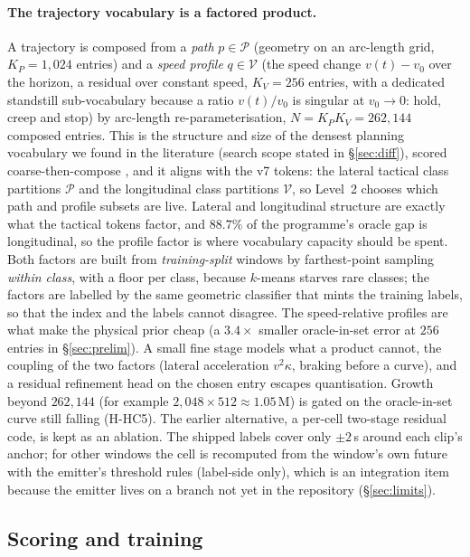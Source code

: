 \paragraph{The trajectory vocabulary is a factored product.}
A trajectory is composed from a \emph{path} $p\in\mathcal P$ (geometry on an arc-length grid, $K_P=1{,}024$ entries) and a \emph{speed profile} $q\in\mathcal V$ (the speed change $v(t)-v_0$ over the horizon, a residual over constant speed, $K_V=256$ entries, with a dedicated standstill sub-vocabulary because a ratio $v(t)/v_0$ is singular at $v_0\to0$: hold, creep and stop) by arc-length re-parameterisation, $N=K_PK_V=262{,}144$ composed entries. This is the structure and size of the densest planning vocabulary we found in the literature (search scope stated in \S\ref{sec:diff}), scored coarse-then-compose \citep{sun2026sparsedrivev2}, and it aligns with the v7 tokens: the lateral tactical class partitions $\mathcal P$ and the longitudinal class partitions $\mathcal V$, so Level~2 chooses which path and profile subsets are live. Lateral and longitudinal structure are exactly what the tactical tokens factor, and $88.7\%$ of the programme's oracle gap is longitudinal\evI, so the profile factor is where vocabulary capacity should be spent.
Both factors are built from \emph{training-split} windows by farthest-point sampling \emph{within class}, with a floor per class, because $k$-means starves rare classes; the factors are labelled by the same geometric classifier that mints the training labels, so that the index and the labels cannot disagree. The speed-relative profiles are what make the physical prior cheap (a $3.4\times$ smaller oracle-in-set error at $256$ entries in \S\ref{sec:prelim}). A small fine stage models what a product cannot, the coupling of the two factors (lateral acceleration $v^2\kappa$, braking before a curve), and a residual refinement head on the chosen entry escapes quantisation.
Growth beyond $262{,}144$ (for example $2{,}048\times512\approx1.05\,$M) is gated on the oracle-in-set curve still falling (H-HC5). The earlier alternative, a per-cell two-stage residual code, is kept as an ablation.
The shipped labels cover only $\pm2$\,s around each clip's anchor; for other windows the cell is recomputed from the window's own future with the emitter's threshold rules (label-side only), which is an integration item because the emitter lives on a branch not yet in the repository (\S\ref{sec:limits}).

\subsection{Scoring and training}\label{sec:train}
